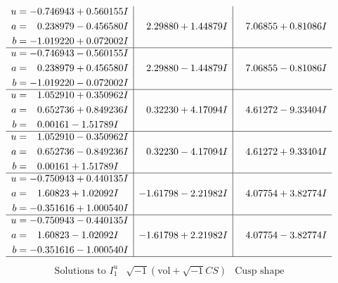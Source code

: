 \documentclass[1p]{elsarticle_modified}
\theoremstyle{definition}
\newcommand{\I}{\sqrt{-1}}
\begin{document}
$$\begin{array}{c|c|c}
\begin{aligned}
u &= -0.746943 + 0.560155 I \\
a &= \phantom{-}0.238979 - 0.456580 I \\
b &= -1.019220 + 0.072002 I\end{aligned}
 & \phantom{-}2.29880 + 1.44879 I & \phantom{-}7.06855 + 0.81086 I \\ \hline\begin{aligned}
u &= -0.746943 - 0.560155 I \\
a &= \phantom{-}0.238979 + 0.456580 I \\
b &= -1.019220 - 0.072002 I\end{aligned}
 & \phantom{-}2.29880 - 1.44879 I & \phantom{-}7.06855 - 0.81086 I \\ \hline\begin{aligned}
u &= \phantom{-}1.052910 + 0.350962 I \\
a &= \phantom{-}0.652736 + 0.849236 I \\
b &= \phantom{-}0.00161 - 1.51789 I\end{aligned}
 & \phantom{-}0.32230 + 4.17094 I & \phantom{-}4.61272 - 9.33404 I \\ \hline\begin{aligned}
u &= \phantom{-}1.052910 - 0.350962 I \\
a &= \phantom{-}0.652736 - 0.849236 I \\
b &= \phantom{-}0.00161 + 1.51789 I\end{aligned}
 & \phantom{-}0.32230 - 4.17094 I & \phantom{-}4.61272 + 9.33404 I \\ \hline\begin{aligned}
u &= -0.750943 + 0.440135 I \\
a &= \phantom{-}1.60823 + 1.02092 I \\
b &= -0.351616 + 1.000540 I\end{aligned}
 & -1.61798 - 2.21982 I & \phantom{-}4.07754 + 3.82774 I \\ \hline\begin{aligned}
u &= -0.750943 - 0.440135 I \\
a &= \phantom{-}1.60823 - 1.02092 I \\
b &= -0.351616 - 1.000540 I\end{aligned}
 & -1.61798 + 2.21982 I & \phantom{-}4.07754 - 3.82774 I\\
 \hline 
 \end{array}$$\newpage$$\begin{array}{c|c|c}  
\text{Solutions to }I^u_{1}& \I (\text{vol} + \sqrt{-1}CS) & \text{Cusp shape}\\

\end{array}$$
\end{document}
